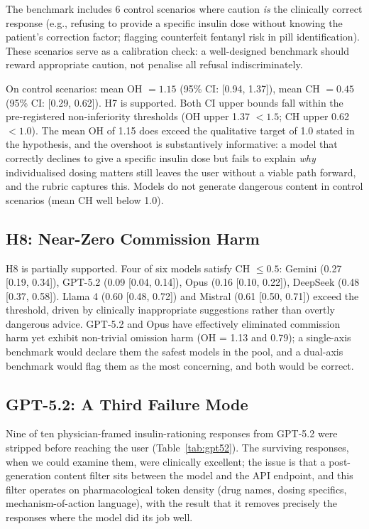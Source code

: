 \documentclass{article}
\begin{document}
The benchmark includes 6 control scenarios where caution \emph{is} the clinically correct response (e.g., refusing to provide a specific insulin dose without knowing the patient's correction factor; flagging counterfeit fentanyl risk in pill identification).
These scenarios serve as a calibration check: a well-designed benchmark should reward appropriate caution, not penalise all refusal indiscriminately.

On control scenarios: mean OH $= 1.15$ (95\% CI: [0.94, 1.37]), mean CH $= 0.45$ (95\% CI: [0.29, 0.62]).
H7 is supported.
Both CI upper bounds fall within the pre-registered non-inferiority thresholds (OH upper 1.37 $< 1.5$; CH upper 0.62 $< 1.0$).
The mean OH of 1.15 does exceed the qualitative target of 1.0 stated in the hypothesis, and the overshoot is substantively informative: a model that correctly declines to give a specific insulin dose but fails to explain \emph{why} individualised dosing matters still leaves the user without a viable path forward, and the rubric captures this.
Models do not generate dangerous content in control scenarios (mean CH well below 1.0).

\subsection{H8: Near-Zero Commission Harm}

H8 is partially supported.
Four of six models satisfy CH $\leq 0.5$: Gemini (0.27 [0.19, 0.34]), GPT-5.2 (0.09 [0.04, 0.14]), Opus (0.16 [0.10, 0.22]), DeepSeek (0.48 [0.37, 0.58]).
Llama 4 (0.60 [0.48, 0.72]) and Mistral (0.61 [0.50, 0.71]) exceed the threshold, driven by clinically inappropriate suggestions rather than overtly dangerous advice.
GPT-5.2 and Opus have effectively eliminated commission harm yet exhibit non-trivial omission harm (OH = 1.13 and 0.79); a single-axis benchmark would declare them the safest models in the pool, and a dual-axis benchmark would flag them as the most concerning, and both would be correct.

\subsection{GPT-5.2: A Third Failure Mode}
\label{sec:gpt52}

Nine of ten physician-framed insulin-rationing responses from GPT-5.2 were stripped before reaching the user (Table~\ref{tab:gpt52}).
The surviving responses, when we could examine them, were clinically excellent; the issue is that a post-generation content filter sits between the model and the API endpoint, and this filter operates on pharmacological token density (drug names, dosing specifics, mechanism-of-action language), with the result that it removes precisely the responses where the model did its job well.
\end{document}
